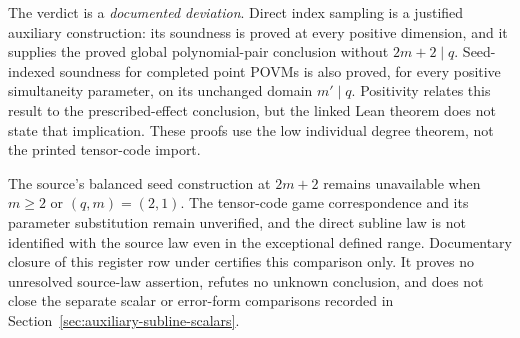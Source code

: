 \documentclass[11pt]{article}
\begin{document}
The verdict is a \emph{documented deviation}. Direct index sampling is a
justified auxiliary construction: its soundness is proved at every positive
dimension, and it supplies the proved global polynomial-pair conclusion
without $2m+2\mid q$. Seed-indexed soundness for completed point POVMs is
also proved, for every positive simultaneity parameter, on its unchanged
domain $m'\mid q$. Positivity relates this result to the prescribed-effect
conclusion, but the linked Lean theorem does not state that implication.
These proofs use the low individual degree theorem, not the printed
tensor-code import.

The source's balanced seed construction at $2m+2$ remains unavailable when
$m\ge2$ or $(q,m)=(2,1)$. The tensor-code game correspondence and its
parameter substitution remain unverified, and the direct subline law is not
identified with the source law even in the exceptional defined range.
Documentary closure of this register row under  certifies this
comparison only. It proves no unresolved source-law assertion, refutes no
unknown conclusion, and does not close the separate scalar or error-form
comparisons recorded in Section~\ref{sec:auxiliary-subline-scalars}.



\end{document}
